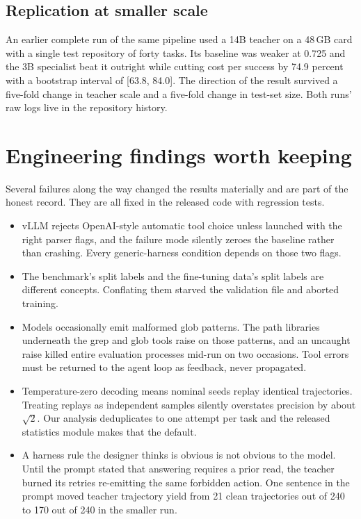 \documentclass[11pt]{article}
\begin{document}
\subsection{Replication at smaller scale}

An earlier complete run of the same pipeline used a 14B teacher on a 48\,GB
card with a single test repository of forty tasks. Its baseline was weaker at
0.725 and the 3B specialist beat it outright while cutting cost per success
by 74.9 percent with a bootstrap interval of [63.8, 84.0]. The direction of
the result survived a five-fold change in teacher scale and a five-fold
change in test-set size. Both runs' raw logs live in the repository history.

\section{Engineering findings worth keeping}

Several failures along the way changed the results materially and are part of
the honest record. They are all fixed in the released code with regression
tests.

\begin{itemize}
  \item vLLM rejects OpenAI-style automatic tool choice unless launched with
        the right parser flags, and the failure mode silently zeroes the
        baseline rather than crashing. Every generic-harness condition
        depends on those two flags.
  \item The benchmark's split labels and the fine-tuning data's split labels
        are different concepts. Conflating them starved the validation file
        and aborted training.
  \item Models occasionally emit malformed glob patterns. The path libraries
        underneath the grep and glob tools raise on those patterns, and an
        uncaught raise killed entire evaluation processes mid-run on two
        occasions. Tool errors must be returned to the agent loop as
        feedback, never propagated.
  \item Temperature-zero decoding means nominal seeds replay identical
        trajectories. Treating replays as independent samples silently
        overstates precision by about $\sqrt{2}$. Our analysis deduplicates
        to one attempt per task and the released statistics module makes
        that the default.
  \item A harness rule the designer thinks is obvious is not obvious to the
        model. Until the prompt stated that answering requires a prior read,
        the teacher burned its retries re-emitting the same forbidden action.
        One sentence in the prompt moved teacher trajectory yield from 21
        clean trajectories out of 240 to 170 out of 240 in the smaller run.
\end{itemize}
\end{document}

